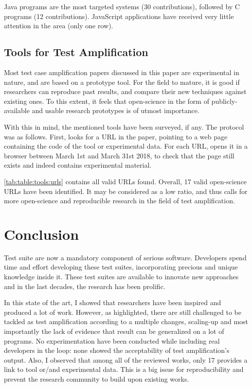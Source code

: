 Java programs are the most targeted systems (30 contributions), followed by C programs (12 contributions). 
JavaScript applications have received very little attention in the area (only one row).

\subsection{Tools for Test Amplification}
\label{subsec:sota:analysis:tools}

Most test case amplification papers discussed in this paper are experimental in nature, and are based on a prototype tool. 
For the field to mature, it is good if researchers can reproduce past results, and compare their new techniques against existing ones.
To this extent, it feels that open-science in the form of publicly-available and usable research prototypes is of utmost importance. 

With this in mind, the mentioned tools have been surveyed, if any. 
The protocol was as follows. 
First, looks for a URL in the paper, pointing to a web page containing the code of the tool or experimental data.  
For each URL, opens it in a browser between March 1st and March 31st 2018, to check that the page still exists and indeed contains experimental material.



\autoref{tab:table:tools:urls} contains all valid URLs found. 
Overall, 17 valid open-science URLs have been identified. 
It may be considered as a low ratio, and thus calls for more open-science and reproducible research in the field of test amplification.

\section{Conclusion}
\label{sec:sota:conclusion}

Test suite are now a mandatory component of serious software.
Developers spend time and effort developing these test suites, incorporating precious and unique knowledge inside it.
These test suites are available to innovate new approaches and in the last decades, the research has been prolific.

In this state of the art, I showed that researchers have been inspired and produced a lot of work.
However, as highlighted, there are still challenged to be tackled as test amplification according to a multiple changes, scaling-up and most importantly the lack of evidence that result can be generalized on a lot of programs.
No experimentation have been conducted while including real developers in the loop: none showed the acceptability of test amplification's output.
Also, I observed that among all of the reviewed works, only 17 provides a link to tool or/and experimental data.
This is a big issue for reproducibility and prevent the research community to build upon existing works.

